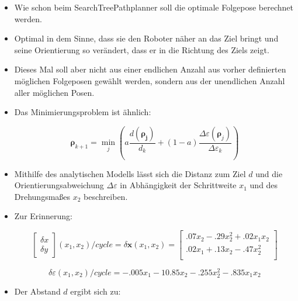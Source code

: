\documentclass[10pt,a4paper]{article}
\begin{document}
\begin{itemize}
	\item Wie schon beim SearchTreePathplanner soll die optimale Folgepose berechnet werden.
	\item Optimal in dem Sinne, dass sie den Roboter näher an das Ziel bringt und seine Orientierung so verändert, dass er in die Richtung des Ziels zeigt.
	\item Dieses Mal soll aber nicht aus einer endlichen Anzahl aus vorher definierten möglichen Folgeposen gewählt werden, sondern aus der unendlichen Anzahl aller möglichen Posen.
	\item Das Minimierungsproblem ist ähnlich:
	
	\begin{equation}
	\bm{\rho}_{k+1} = \min_{j} \left( a \frac{d(\bm{\rho_j})}{d_k} + (1-a)\frac{\Delta \varepsilon (\bm{\rho}_j)}{\Delta \varepsilon_k} \right)	
	\end{equation}
	
	\item Mithilfe des analytischen Modells lässt sich die Distanz zum Ziel $d$ und die Orientierungsabweichung $\Delta \varepsilon$ in Abhängigkeit der Schrittweite $x_1$ und des Drehungsmaßes $x_2$ beschreiben.
	
	\item Zur Erinnerung:
	
		\begin{equation}
		\begin{bmatrix}	\delta x \\ \delta y \end{bmatrix} (x_1, x_2) /cycle =\delta \bm{x} (x_1, x_2)= \begin{bmatrix}
		.07x_2 - .29 x_2^2 + .02 x_1x_2 \\
		.02x_1 + .13x_2 - .47x_2^2 \\
		\end{bmatrix}
		\end{equation}
		

		\begin{equation}
		\delta \varepsilon (x_1, x_2) / {cycle} = -.005x_1 - 10.85 x_2 -.255 x_2^2 - .835x_1x_2
		\end{equation}
	
	\item Der Abstand $d$ ergibt sich zu:
	

\end{itemize}
\end{document}

